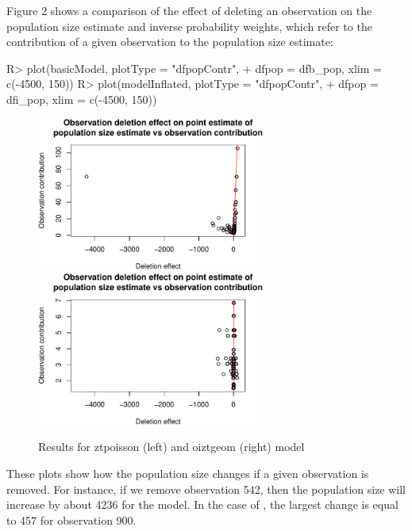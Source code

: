 \documentclass[
]{jss}
\newcommand{\1}{\mathcal{I}} \newcommand{\bZero}{\boldsymbol{0}}
\begin{document}
Figure 2 shows a comparison of the effect of deleting an observation on
the population size estimate and inverse probability weights, which
refer to the contribution of a given observation to the population size
estimate:

\begin{CodeChunk}
\begin{CodeInput}
R> plot(basicModel, plotType = "dfpopContr", 
+      dfpop = dfb_pop, xlim = c(-4500, 150))
R> plot(modelInflated, plotType = "dfpopContr", 
+      dfpop = dfi_pop, xlim = c(-4500, 150))
\end{CodeInput}
\begin{figure}[ht]

{\centering \includegraphics[width=7.5cm]{singleRcapture_files/figure-latex/dfpopsize_plot-1} \includegraphics[width=7.5cm]{singleRcapture_files/figure-latex/dfpopsize_plot-2} 

}

\caption[Results for ztpoisson (left) and oiztgeom (right) model]{Results for ztpoisson (left) and oiztgeom (right) model}\label{fig:dfpopsize_plot}
\end{figure}
\end{CodeChunk}

These plots show how the population size changes if a given observation
is removed. For instance, if we remove observation 542, then the
population size will increase by about 4236 for the 
model. In the case of , the largest change is equal to
457 for observation 900.
\end{document}
